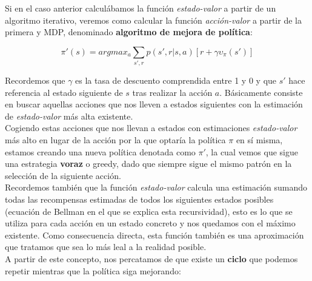\documentclass[11pt,fleqn]{book} %
\begin{document}
Si en el caso anterior calculábamos la función \textit{estado-valor} a partir de un algoritmo iterativo, veremos como calcular la función \textit{acción-valor} a partir de la primera y MDP, denominado \textbf{algoritmo de mejora de política}:


\begin{equation}\label{eqn:2}
\pi'(s)=argmax_a\sum_{s',r}p(s',r|s,a)\left[r+\gamma\upsilon_\pi(s')\right]
\end{equation}

Recordemos que $\gamma$ es la tasa de descuento comprendida entre 1 y 0 y que $s'$ hace referencia al estado siguiente de $s$ tras realizar la acción $a$. Básicamente consiste en buscar aquellas acciones que nos lleven a estados siguientes con la estimación de \textit{estado-valor} más alta existente. \\

Cogiendo estas acciones que nos llevan a estados con estimaciones \textit{estado-valor} más alto en lugar de la acción por la que optaría la política $\pi$ en sí misma, estamos creando una nueva política denotada como $\pi'$, la cual vemos que sigue una estrategia \textbf{voraz} o greedy, dado que siempre sigue el mismo patrón en la selección de la siguiente acción. \\

Recordemos también que la función \textit{estado-valor} calcula una estimación sumando todas las recompensas estimadas de todos los siguientes estados posibles (ecuación de Bellman en el que se explica esta recursividad), esto es lo que se utiliza para cada acción en un estado concreto y nos quedamos con el máximo existente. Como consecuencia directa, esta función también es una aproximación que tratamos que sea lo más leal a la realidad posible. \\

A partir de este concepto, nos percatamos de que existe un \textbf{ciclo} que podemos repetir mientras que la política siga mejorando: \\
\end{document}
